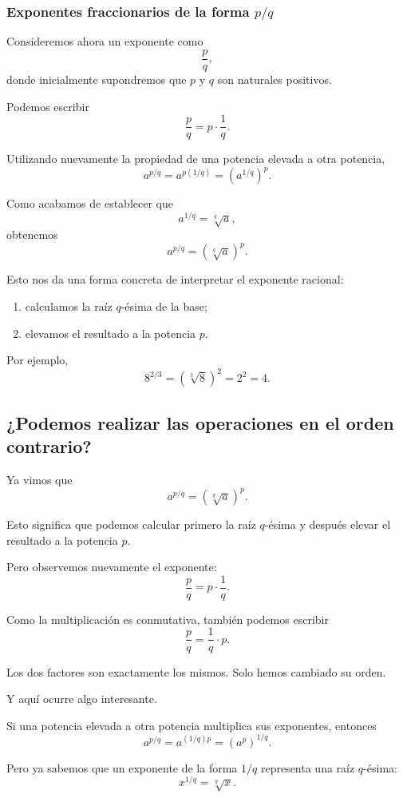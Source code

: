 \subsubsection{Exponentes fraccionarios de la forma \(p/q\)}

Consideremos ahora un exponente como
\[
\frac{p}{q},
\]
donde inicialmente supondremos que \(p\) y \(q\) son naturales positivos.

Podemos escribir
\[
\frac pq=p\cdot\frac1q.
\]

Utilizando nuevamente la propiedad de una potencia elevada a otra potencia,
\[
a^{p/q}
=
a^{p(1/q)}
=
\left(a^{1/q}\right)^p.
\]

Como acabamos de establecer que
\[
a^{1/q}=\sqrt[q]{a},
\]
obtenemos
\[
\boxed{
a^{p/q}
=
\left(\sqrt[q]{a}\right)^p
}.
\]

Esto nos da una forma concreta de interpretar el exponente racional:

\begin{enumerate}
    \item calculamos la raíz \(q\)-ésima de la base;
    \item elevamos el resultado a la potencia \(p\).
\end{enumerate}

Por ejemplo,
\[
8^{2/3}
=
\left(\sqrt[3]{8}\right)^2
=
2^2
=
4.
\]

\subsection{¿Podemos realizar las operaciones en el orden contrario?}

Ya vimos que
\[
a^{p/q}
=
\left(\sqrt[q]{a}\right)^p.
\]

Esto significa que podemos calcular primero la raíz \(q\)-ésima y después elevar el resultado a la potencia \(p\).

Pero observemos nuevamente el exponente:
\[
\frac pq
=
p\cdot\frac1q.
\]

Como la multiplicación es conmutativa, también podemos escribir
\[
\frac pq
=
\frac1q\cdot p.
\]

Los dos factores son exactamente los mismos. Solo hemos cambiado su orden.

Y aquí ocurre algo interesante.

Si una potencia elevada a otra potencia multiplica sus exponentes, entonces
\[
a^{p/q}
=
a^{(1/q)p}
=
\left(a^p\right)^{1/q}.
\]

Pero ya sabemos que un exponente de la forma \(1/q\) representa una raíz \(q\)-ésima:
\[
x^{1/q}=\sqrt[q]{x}.
\]

